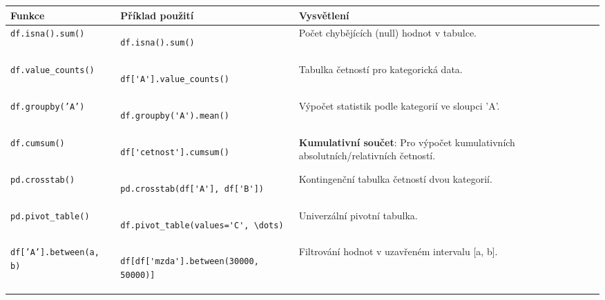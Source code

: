 \documentclass[a4paper, 11pt]{article}
\newenvironment{funkcedict}
{%
  \begingroup
  \renewcommand{\arraystretch}{1.4}%
  \lstset{basicstyle=\ttfamily\small, columns=fullflexible}%
  \setlength{\tabcolsep}{4pt}%
  \begin{tabular}{p{0.19\textwidth} p{0.38\textwidth} p{0.30\textwidth}}
  \textbf{Funkce} & \textbf{Příklad použití} & \textbf{Vysvětlení} \\
  \midrule
}
{%
  \end{tabular}%
  \endgroup
}
\begin{document}
			\begin{funkcedict}
				\texttt{df.isna().sum()} &
				\begin{lstlisting}
df.isna().sum()
				\end{lstlisting}
				& Počet chybějících (null) hodnot v tabulce. \\
				\texttt{df.value\_counts()} &
				\begin{lstlisting}
df['A'].value_counts()
				\end{lstlisting}
				& Tabulka četností pro kategorická data. \\
				\texttt{df.groupby('A')} &
				\begin{lstlisting}
df.groupby('A').mean()
				\end{lstlisting}
				& Výpočet statistik podle kategorií ve sloupci 'A'. \\
				\texttt{df.cumsum()} &
				\begin{lstlisting}
df['cetnost'].cumsum()
				\end{lstlisting}
				& \textbf{Kumulativní součet}: Pro výpočet kumulativních absolutních/relativních četností. \\
				\texttt{pd.crosstab()} &
				\begin{lstlisting}
pd.crosstab(df['A'], df['B'])
				\end{lstlisting}
				& Kontingenční tabulka četností dvou kategorií. \\
				\texttt{pd.pivot\_table()} &
				\begin{lstlisting}
df.pivot_table(values='C', \dots)
				\end{lstlisting}
				& Univerzální pivotní tabulka. \\
				\texttt{df['A'].between(a, b)} &
				\begin{lstlisting}
df[df['mzda'].between(30000, 50000)]
				\end{lstlisting}
				& Filtrování hodnot v uzavřeném intervalu [a, b]. \\
			\end{funkcedict}
\end{document}
